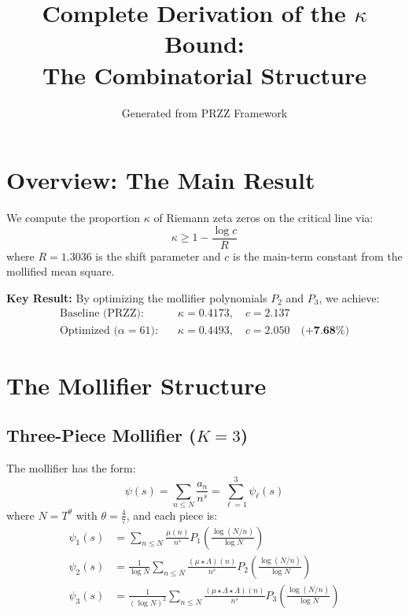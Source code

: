 \documentclass[11pt]{article}
\title{Complete Derivation of the $\kappa$ Bound:\\The Combinatorial Structure}
\author{Generated from PRZZ Framework}
\date{}
\begin{document}
\maketitle

\section{Overview: The Main Result}

We compute the proportion $\kappa$ of Riemann zeta zeros on the critical line via:
\begin{equation}
\boxed{\kappa \geq 1 - \frac{\log c}{R}}
\end{equation}
where $R = 1.3036$ is the shift parameter and $c$ is the main-term constant from the mollified mean square.

\textbf{Key Result:} By optimizing the mollifier polynomials $P_2$ and $P_3$, we achieve:
\begin{align*}
\text{Baseline (PRZZ):} \quad & \kappa = 0.4173, \quad c = 2.137 \\
\text{Optimized ($\alpha=61$):} \quad & \kappa = 0.4493, \quad c = 2.050 \quad \textbf{(+7.68\%)}
\end{align*}

\section{The Mollifier Structure}

\subsection{Three-Piece Mollifier ($K=3$)}

The mollifier has the form:
\begin{equation}
\psi(s) = \sum_{n \leq N} \frac{a_n}{n^s} = \sum_{\ell=1}^{3} \psi_\ell(s)
\end{equation}
where $N = T^\theta$ with $\theta = \frac{4}{7}$, and each piece is:
\begin{align}
\psi_1(s) &= \sum_{n \leq N} \frac{\mu(n)}{n^s} P_1\left(\frac{\log(N/n)}{\log N}\right) \\
\psi_2(s) &= \frac{1}{\log N} \sum_{n \leq N} \frac{(\mu \star \Lambda)(n)}{n^s} P_2\left(\frac{\log(N/n)}{\log N}\right) \\
\psi_3(s) &= \frac{1}{(\log N)^2} \sum_{n \leq N} \frac{(\mu \star \Lambda \star \Lambda)(n)}{n^s} P_3\left(\frac{\log(N/n)}{\log N}\right)
\end{align}
\end{document}
